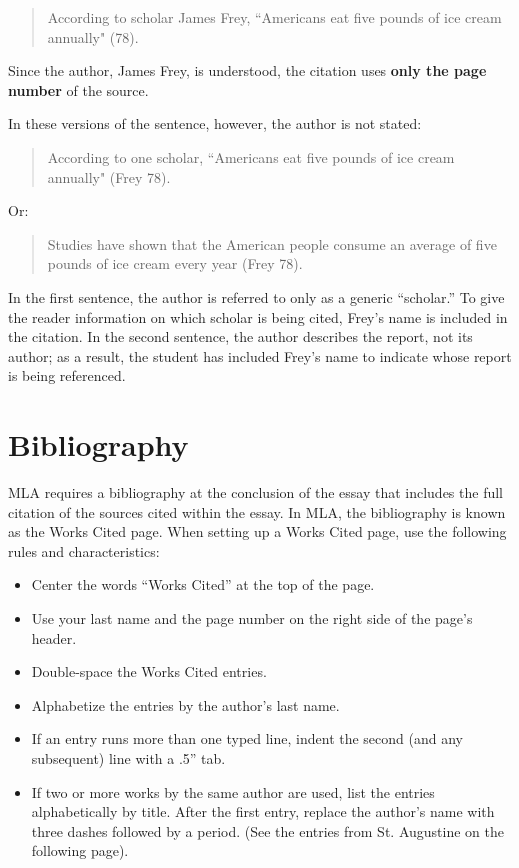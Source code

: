 \begin{quote}According to scholar James Frey, ``Americans eat five pounds of ice cream annually" (78).
\end{quote}

Since the author, James Frey, is understood, the citation uses \textbf{only the page number} of the source.

In these versions of the sentence, however, the author is not stated:

\begin{quote}
According to one scholar, ``Americans eat five pounds of ice cream annually" (Frey 78).
\end{quote}
Or:

\begin{quote}
Studies have shown that the American people consume an average of five pounds of ice cream every year (Frey 78).
\end{quote}
In the first sentence, the author is referred to only as a generic ``scholar.'' To give the reader information on which scholar is being cited, Frey's name is included in the citation. In the second sentence, the author describes the report, not its author; as a result, the student has included Frey's name to indicate whose report is being referenced. 


\section{Bibliography}

MLA requires a bibliography at the conclusion of the essay that includes the full citation of the sources cited within the essay. In MLA, the bibliography is known as the Works Cited page. When setting up a Works Cited page, use the following rules and characteristics:

\begin{itemize}
\item Center the words ``Works Cited'' at the top of the page.
\item Use your last name and the page number on the right side of the page's header.
\item Double-space the Works Cited entries.
\item Alphabetize the entries by the author's last name.
\item If an entry runs more than one typed line, indent the second (and any subsequent) line with a .5'' tab.
\item If two or more works by the same author are used, list the entries alphabetically by title. After the first entry, replace the author's name with three dashes followed by a period. (See the entries from St. Augustine on the following page).
\end{itemize}


